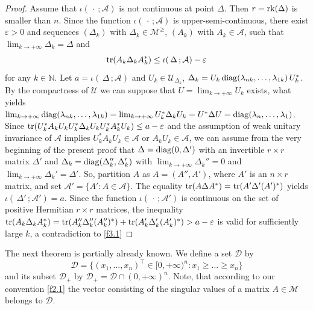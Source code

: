 \documentclass{amsart}
\begin{document}
\begin{proof}
Assume that $\iota(\,\cdot\,;{\mathcal A})$ is not continuous at point $\Delta$. Then $r={\rm rk}(\Delta)$ is smaller than $n$. Since the function $\iota(\,\cdot\,;{\mathcal A})$ is upper-semi-continuous, there exist $\varepsilon > 0$ and sequences $(\Delta_k)$ with $\Delta_k \in {\mathcal M}^\geq$, $(A_k)$ with $A_k \in \mathcal A$, such that $\lim_{k \to +\infty}\Delta_k = \Delta$ and
\begin{equation} \label{f3.1}
      {\rm tr} (A_k\Delta_kA_k^*) \leq \iota(\,\Delta\,;{\mathcal A}) - \varepsilon
\end{equation}
for any $k \in \mathbb N$. Let $a = \iota(\,\Delta\,;{\mathcal A})$ and $U_k \in {\mathcal U}_{\Delta_k}$, $\Delta_k = U_k \, {\rm diag}(\lambda_{n k}, \ldots , \lambda_{1 k}) \, U_k^*$. By the compactness of $\mathcal U$ we can suppose that $U=\lim_{k \to +\infty}U_k$ exists, what yields $\lim_{k \to +\infty} {\rm diag}(\lambda_{n k}, \ldots , \lambda_{1 k}) = \lim_{k \to +\infty} U_k^* \Delta_k U_k = U^* \Delta U = {\rm diag}(\lambda_n, \ldots ,\lambda_1)$. Since ${\rm tr}(U_k^*A_kU_kU_k^*\Delta_kU_kU_k^*A_k^*U_k) \leq a-\varepsilon$ and the assumption of weak unitary invariance of $\mathcal A$ implies $U_k^*A_kU_k \in \mathcal A$ or $A_kU_k \in \mathcal A$, we can assume from the very beginning of the present proof that $\Delta = {\rm diag}(0, \Delta')$ with an invertible $r \times r$ matrix $\Delta'$ and $\Delta_k={\rm diag}(\Delta_k'' , \Delta_k')$ with $\lim_{k \to +\infty} \Delta_k'' = 0$ and $\lim_{k \to +\infty} \Delta_k' = \Delta'$. So, partition $A$ as $A=(A'',A')$, where $A'$ is an $n \times r$ matrix, and set ${\mathcal A}'=\{ A' : A \in {\mathcal A} \}$. The equality ${\rm tr}(A \Delta A^*) = {\rm tr}(A' \Delta' (A')^*)$ yields $\iota(\,\Delta'\,;{\mathcal A}')=a$. Since the function $\iota(\,\cdot\,;{\mathcal A}')$ is continuous on the set of positive Hermitian $r \times r$ matrices, the inequality ${\rm tr}(A_k\Delta_k A_k^*)= {\rm tr}(A_k''\Delta_k''(A_k'')^*) + {\rm tr} (A_k'\Delta_k'(A_k')^*) > a-\varepsilon$ is valid for sufficiently large $k$, a contradiction to \eqref{f3.1}
\end{proof}

The next theorem is partially already known. We define a set $\mathcal D$ by
\begin{equation} \label{f3.2}
    {\mathcal D} = \{ (x_1, \ldots ,x_n)^\top \in [0,+\infty)^n : x_1 \geq \ldots \geq x_n \}
\end{equation}
and its subset ${\mathcal D}_+$ by  ${\mathcal D}_+ = {\mathcal D} \cap (0,+\infty)^n$. Note, that according to our convention \eqref{f2.1} the vector consisting of the singular values of a matrix $A \in \mathcal M$ belongs to $\mathcal D$. 
\end{document}
